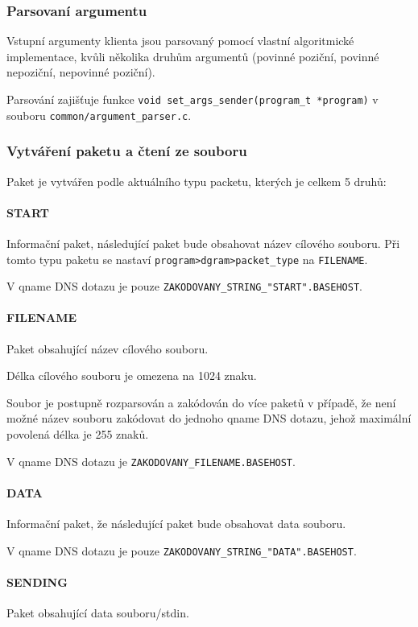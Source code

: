 \subsubsection{Parsovaní argumentu} \label{sec:parsovani-argumentu-k}
Vstupní argumenty klienta jsou parsovaný pomocí vlastní algoritmické
implementace, kvůli několika druhům argumentů
(povinné poziční, povinné nepoziční, nepovinné poziční).

Parsování zajišťuje funkce \texttt{void set\_args\_sender(program\_t *program)}
v souboru \texttt{common/argument\_parser.c}.

\subsubsection{Vytváření paketu a čtení ze souboru} \label{sec:vytvareni-paketu-k}

Paket je vytvářen podle aktuálního typu packetu, kterých je celkem 5 druhů:

\paragraph{START}
Informační paket, následující paket bude obsahovat název cílového souboru.
Při tomto typu paketu se nastaví \texttt{program\->dgram\->packet\_type} na \texttt{FILENAME}.

V qname DNS dotazu je pouze \texttt{ZAKODOVANY\_STRING\_"START".BASEHOST}.

\paragraph{FILENAME}
Paket obsahující název cílového souboru.

Délka cílového souboru je omezena na 1024 znaku.

Soubor je postupně rozparsován a zakódován
do více paketů v případě, že není možné název souboru
zakódovat do jednoho qname DNS dotazu,
jehož maximální povolená délka je 255 znaků.

V qname DNS dotazu je \texttt{ZAKODOVANY\_FILENAME.BASEHOST}.

\paragraph{DATA}
Informační paket, že následující paket bude obsahovat data souboru.

V qname DNS dotazu je pouze \texttt{ZAKODOVANY\_STRING\_"DATA".BASEHOST}.

\paragraph{SENDING}
Paket obsahující data souboru/stdin.

